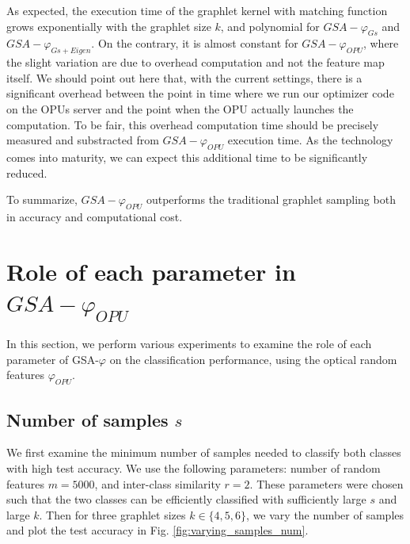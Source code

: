 As expected, the execution time of the graphlet kernel with matching function grows exponentially with the graphlet size $k$, and polynomial for $GSA-\varphi_{Gs}$ and $GSA-\varphi_{Gs+Eigen}$. On the contrary, it is almost constant for $GSA-\varphi_{OPU}$, where the slight variation are due to overhead computation and not the feature map itself. We should point out here that, with the current settings, there is a significant overhead between the point in time where we run our optimizer code on the OPUs server and the point when the OPU actually launches the computation. To be fair, this overhead computation time should be precisely measured and substracted from $GSA-\varphi_{OPU}$ execution time. As the technology comes into maturity, we can expect this additional time to be significantly reduced. 

To summarize, $GSA-\varphi_{OPU}$ outperforms the traditional graphlet sampling both in accuracy and computational cost.

\section{Role of each parameter in $GSA-\varphi_{OPU}$}

In this section, we perform various experiments to examine the role of each parameter of GSA-$\varphi$ on the classification performance, using the optical random features $\varphi_{OPU}$.

\subsection{Number of samples $s$}
We first examine the minimum number of samples needed to classify both classes with high test accuracy.%
%
 We use the following parameters: number of random features $m=5000$, and inter-class similarity $r=2$. These parameters were chosen such that the two classes can be efficiently classified with sufficiently large $s$ and large $k$. Then for three graphlet sizes $k\in\{4,5,6\}$, we vary the number of samples and plot the test accuracy in Fig. \ref{fig:varying_samples_num}.

